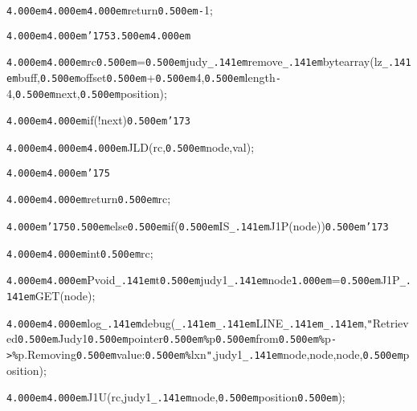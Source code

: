 \noindent
{}{\tt\mc \kern4.000em}{\tt\mc \kern4.000em}{\tt\mc \kern4.000em}return{\tt\mc \kern0.500em}{\tt -}1;

\noindent
{}{\tt\mc \kern4.000em}{\tt\mc \kern4.000em}{\tt\char'175}{\tt\mc \kern3.500em}{\tt\mc \kern4.000em}

\noindent
{}{\tt\mc \kern4.000em}{\tt\mc \kern4.000em}rc{\tt\mc \kern0.500em}={\tt\mc \kern0.500em}judy{\tt\_\kern.141em}remove{\tt\_\kern.141em}bytearray(lz{\tt\_\kern.141em}buff,{\tt\mc \kern0.500em}offset{\tt\mc \kern0.500em}+{\tt\mc \kern0.500em}4,{\tt\mc \kern0.500em}length{\tt -}4,{\tt\mc \kern0.500em}next,{\tt\mc \kern0.500em}position);

\noindent
{}{\tt\mc \kern4.000em}{\tt\mc \kern4.000em}if(!{\tt *}next){\tt\mc \kern0.500em}{\tt\char'173}

\noindent
{}{\tt\mc \kern4.000em}{\tt\mc \kern4.000em}{\tt\mc \kern4.000em}JLD(rc,{\tt\mc \kern0.500em}{\tt *}node,val);

\noindent
{}{\tt\mc \kern4.000em}{\tt\mc \kern4.000em}{\tt\char'175}

\noindent
{}{\tt\mc \kern4.000em}{\tt\mc \kern4.000em}return{\tt\mc \kern0.500em}rc;

\noindent
{}{\tt\mc \kern4.000em}{\tt\char'175}{\tt\mc \kern0.500em}else{\tt\mc \kern0.500em}if({\tt\mc \kern0.500em}IS{\tt\_\kern.141em}J1P({\tt *}node)){\tt\mc \kern0.500em}{\tt\char'173}

\noindent
{}{\tt\mc \kern4.000em}{\tt\mc \kern4.000em}int{\tt\mc \kern0.500em}rc;

\noindent
{}{\tt\mc \kern4.000em}{\tt\mc \kern4.000em}Pvoid{\tt\_\kern.141em}t{\tt\mc \kern0.500em}judy1{\tt\_\kern.141em}node{\tt\mc \kern1.000em}={\tt\mc \kern0.500em}J1P{\tt\_\kern.141em}GET({\tt *}node);

\noindent
{}\hfill

\noindent
{}{\tt\mc \kern4.000em}{\tt\mc \kern4.000em}log{\tt\_\kern.141em}debug({\tt\_\kern.141em}{\tt\_\kern.141em}LINE{\tt\_\kern.141em}{\tt\_\kern.141em},{\tt "}Retrieved{\tt\mc \kern0.500em}Judy1{\tt\mc \kern0.500em}pointer{\tt\mc \kern0.500em}{\tt\%}p{\tt\mc \kern0.500em}from{\tt\mc \kern0.500em}{\tt\%}p{\tt -}{\tt >}{\tt\%}p.Removing{\tt\mc \kern0.500em}value:{\tt\mc \kern0.500em}{\tt\%}lx{\tt{}}n{\tt "},judy1{\tt\_\kern.141em}node,node,{\tt *}node,{\tt\mc \kern0.500em}position);

\noindent
{}\hfill

\noindent
{}{\tt\mc \kern4.000em}{\tt\mc \kern4.000em}J1U(rc,judy1{\tt\_\kern.141em}node,{\tt\mc \kern0.500em}position{\tt\mc \kern0.500em});

